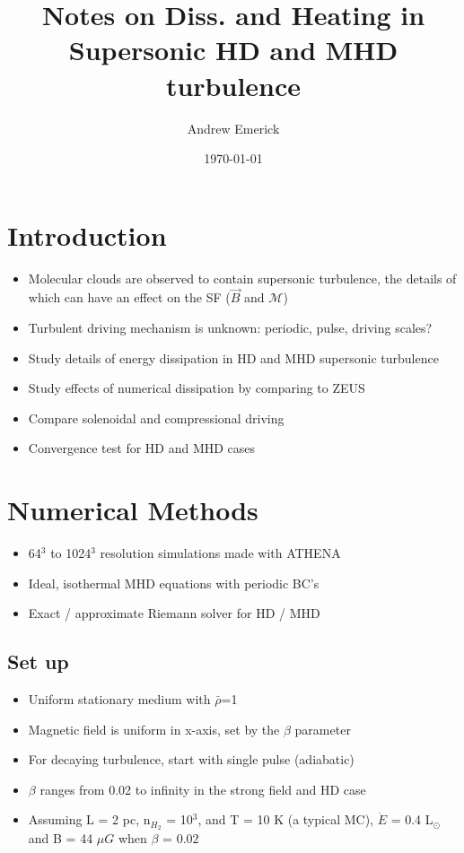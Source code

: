 \documentclass[a4paper]{article}
\date{\today}
\title{Notes on Diss. and Heating in Supersonic HD and MHD turbulence}
\author{Andrew Emerick}
\begin{document}
\maketitle

\section{Introduction}
\begin{itemize}
\item Molecular clouds are observed to contain supersonic turbulence, the details
of which can have an effect on the SF ($\vec{B}$ and $\mathcal{M}$)
\item Turbulent driving mechanism is unknown: periodic, pulse, driving scales?
\item Study details of energy dissipation in HD and MHD supersonic turbulence
\item Study effects of numerical dissipation by comparing to ZEUS
\item Compare solenoidal and compressional driving
\item Convergence test for HD and MHD cases
\end{itemize}

\section{Numerical Methods}
\begin{itemize}
\item 64$^{3}$ to 1024$^{3}$ resolution simulations made with ATHENA
\item Ideal, isothermal MHD equations with periodic BC's
\item Exact / approximate Riemann solver for HD / MHD
\end{itemize}
\subsection{Set up}
\begin{itemize}
\item Uniform stationary medium with $\bar{\rho}$=1
\item Magnetic field is uniform in x-axis, set by the $\beta$ parameter
\item For decaying turbulence, start with single pulse (adiabatic)
\item $\beta$ ranges from 0.02 to infinity in the strong field and HD case
\item Assuming L = 2 pc, n$_{H_2}$ = 10$^{3}$, and T = 10 K (a typical MC),
$\dot{E}$ = 0.4 L$_{\odot}$ and B = 44 $\mu G$ when $\beta$ = 0.02
\end{itemize}
\end{document}
